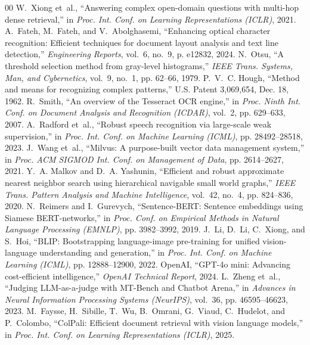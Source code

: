 \documentclass[conference]{IEEEtran}
\begin{document}
\begin{thebibliography}{00}
W.~Xiong et~al., ``Answering complex open-domain questions with multi-hop dense retrieval,'' in \emph{Proc. Int. Conf. on Learning Representations (ICLR)}, 2021.
A.~Fateh, M.~Fateh, and V.~Abolghasemi, ``Enhancing optical character recognition: Efficient techniques for document layout analysis and text line detection,'' \emph{Engineering Reports}, vol.~6, no.~9, p. e12832, 2024.
N.~Otsu, ``A threshold selection method from gray-level histograms,'' \emph{IEEE Trans. Systems, Man, and Cybernetics}, vol.~9, no.~1, pp. 62--66, 1979.
P.~V.~C. Hough, ``Method and means for recognizing complex patterns,'' U.S. Patent 3,069,654, Dec. 18, 1962.
R.~Smith, ``An overview of the Tesseract OCR engine,'' in \emph{Proc. Ninth Int. Conf. on Document Analysis and Recognition (ICDAR)}, vol.~2, pp. 629--633, 2007.
A.~Radford et~al., ``Robust speech recognition via large-scale weak supervision,'' in \emph{Proc. Int. Conf. on Machine Learning (ICML)}, pp. 28492--28518, 2023.
J.~Wang et~al., ``Milvus: A purpose-built vector data management system,'' in \emph{Proc. ACM SIGMOD Int. Conf. on Management of Data}, pp. 2614--2627, 2021.
Y.~A. Malkov and D.~A. Yashunin, ``Efficient and robust approximate nearest neighbor search using hierarchical navigable small world graphs,'' \emph{IEEE Trans. Pattern Analysis and Machine Intelligence}, vol.~42, no.~4, pp. 824--836, 2020.
N.~Reimers and I.~Gurevych, ``Sentence-BERT: Sentence embeddings using Siamese BERT-networks,'' in \emph{Proc. Conf. on Empirical Methods in Natural Language Processing (EMNLP)}, pp. 3982--3992, 2019.
J.~Li, D.~Li, C.~Xiong, and S.~Hoi, ``BLIP: Bootstrapping language-image pre-training for unified vision-language understanding and generation,'' in \emph{Proc. Int. Conf. on Machine Learning (ICML)}, pp. 12888--12900, 2022.
OpenAI, ``GPT-4o mini: Advancing cost-efficient intelligence,'' \emph{OpenAI Technical Report}, 2024.
L.~Zheng et~al., ``Judging LLM-as-a-judge with MT-Bench and Chatbot Arena,'' in \emph{Advances in Neural Information Processing Systems (NeurIPS)}, vol.~36, pp. 46595--46623, 2023.
M.~Faysse, H.~Sibille, T.~Wu, B.~Omrani, G.~Viaud, C.~Hudelot, and P.~Colombo, ``ColPali: Efficient document retrieval with vision language models,'' in \emph{Proc. Int. Conf. on Learning Representations (ICLR)}, 2025.

\end{thebibliography}
\end{document}
